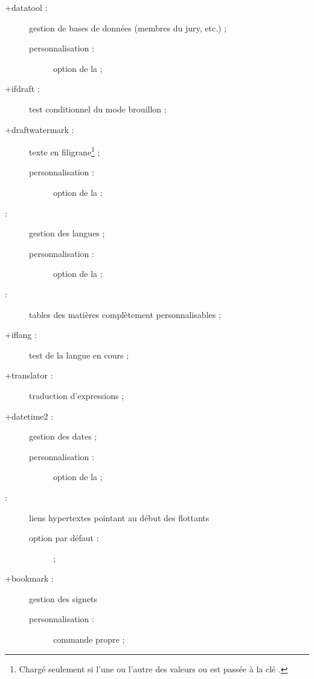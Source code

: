 \begin{description}
\begin{description}
  \end{description}
\item[\package*+{datatool} :] gestion de bases de données (membres du jury,
  etc.) ;
  \begin{description}
  \item[personnalisation :] option  de la \yatCl{} ;
  \end{description}
\item[\package*+{ifdraft} :] test conditionnel du mode brouillon ;
\item[\package+{draftwatermark} :] texte en
  filigrane\footnote{Chargé seulement si l'une ou l'autre des
    valeurs  ou  est passée à la clé
    .} ;
  \begin{description}
  \item[personnalisation :] option  de la \yatCl{} ;
  \end{description}
\item[\package{babel} :] gestion des langues ;
  \begin{description}
  \item[personnalisation :] option  de la \yatCl{} ;
  \end{description}
\item[\package{etoc} :] tables des matières complètement personnalisables ;
\item[\package*+{iflang} :] test de la langue en cours ;
\item[\package*+{translator} :] traduction d'expressions ;
\item[\package+{datetime2} :] %
  gestion des dates ;
  \begin{description}
  \item[personnalisation :] option  de la \yatCl{} ;
  \end{description}
\item[\package{hypcap} :] liens hypertextes pointant au début des
  flottants%
  \begin{description}
  \item[option par défaut :]  ;
  \end{description}
\item[\package+{bookmark} :] gestion des signets%
  \begin{description}
  \item[personnalisation :] commande propre  ;
  \end{description}
\end{description}


